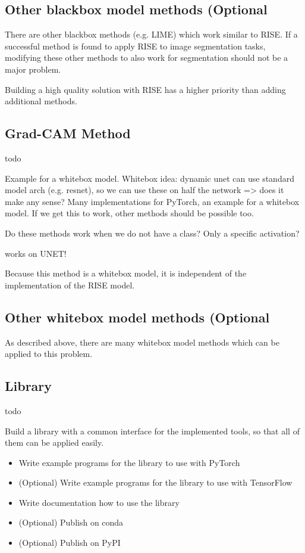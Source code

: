 \subsection{Other blackbox model methods (Optional}
There are other blackbox methods (e.g. LIME\cite{ribeiro2016should}) which work similar to RISE. If a successful method is found to apply RISE to image segmentation tasks, modifying these other methods to also work for segmentation should not be a major problem.

Building a high quality solution with RISE has a higher priority than adding additional methods.

\subsection{Grad-CAM Method}
todo



Example for a whitebox model. Whitebox idea: dynamic unet can use standard model arch (e.g. resnet), so we can use these on half the network => does it make any sense?
Many implementations for PyTorch, an example for a whitebox model. If we get this to work, other methods should be possible too.

Do these methods work when we do not have a class? Only a specific activation?

works on UNET!

Because this method is a whitebox model, it is independent of the implementation of the RISE model.


\subsection{Other whitebox model methods (Optional}
As described above, there are many whitebox model methods which can be applied to this problem.

\subsection{Library}
todo

Build a library with a common interface for the implemented tools, so that all of them can be applied easily.
\begin{itemize}
    \item Write example programs for the library to use with PyTorch
    \item (Optional) Write example programs for the library to use with TensorFlow
    \item Write documentation how to use the library
    \item (Optional) Publish on conda
    \item (Optional) Publish on PyPI
    
\end{itemize}

